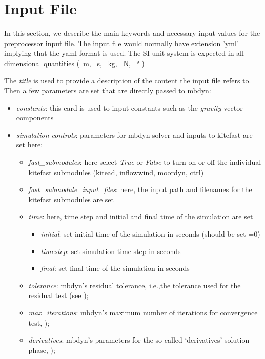\documentclass[report]{nrel}
\def\ie{i.e., }
\def\ie{i.e.,}
\begin{document}
\section{Input File}\label{sec:inputfile}

In this section, we describe the main keywords and necessary input values for the preprocessor input file. The input file would normally have extension 'yml' implying that the \gls{yaml} format is used. The SI unit system is expected in all dimensional quantities (\SI{}{\m}, \SI{}{\s}, \SI{}{\kg}, \SI{}{\N}, \SI{}{\degree} )

The \emph{title} is used to provide a description of the content the input file refers to.
Then a few parameters are set that are directly passed to \gls{mbdyn}:
\begin{itemize}
	\item \emph{constants}: this card is used to input constants such as the \emph{gravity} vector components
%	
	\item \emph{simulation controls}: parameters for \gls{mbdyn} solver and inputs to \gls{kitefast} are set here:
%
	\begin{itemize}
		\item \emph{fast\_submodules}: here select \emph{True} or \emph{False} to turn on or off the individual \gls{kitefast} submodules (\gls{kitead}, \gls{inflowwind}, \gls{moordyn}, \gls{ctrl})
		\item \emph{fast\_submodule\_input\_files}: here, the input path and filenames for the \gls{kitefast} submodules are set
		\item \emph{time}: here, time step and initial and final time of the simulation are set
		\begin{itemize}
			\item \emph{initial}: set initial time of the simulation in seconds (should be set =0)
			\item \emph{timestep}: set simulation time step in seconds
			\item \emph{final}: set final time of the simulation in seconds
		\end{itemize}
		\item \emph{tolerance}: \gls{mbdyn}'s residual tolerance, \ie the tolerance used for the residual test (see \cite{masarati2017});
		\item \emph{max\_iterations}: \gls{mbdyn}'s maximum number of iterations for convergence test, \citep[see][]{masarati2017});
		\item \emph{derivatives}: \gls{mbdyn}'s parameters for the so-called `derivatives' solution phase, \citep[see][]{masarati2017});

\end{itemize}
\end{itemize}
\end{document}
